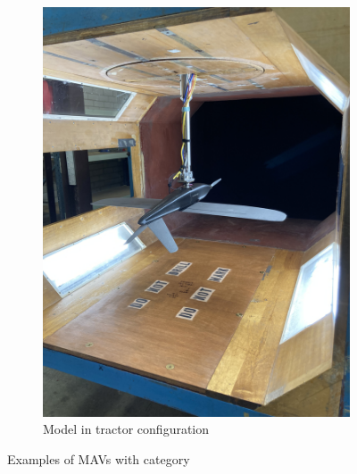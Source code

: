 \begin{figure}[H]
\begin{subfigure}[b]{0.3\textwidth}
             \centering
             \includegraphics[scale=0.05]{04_Methodology/Figs/tractors}
             \caption{Model in tractor configuration}
             \label{fig:tractors}
     \end{subfigure}
        \caption{Examples of MAVs with category}
        \label{fig:typesUsed}
\end{figure}

